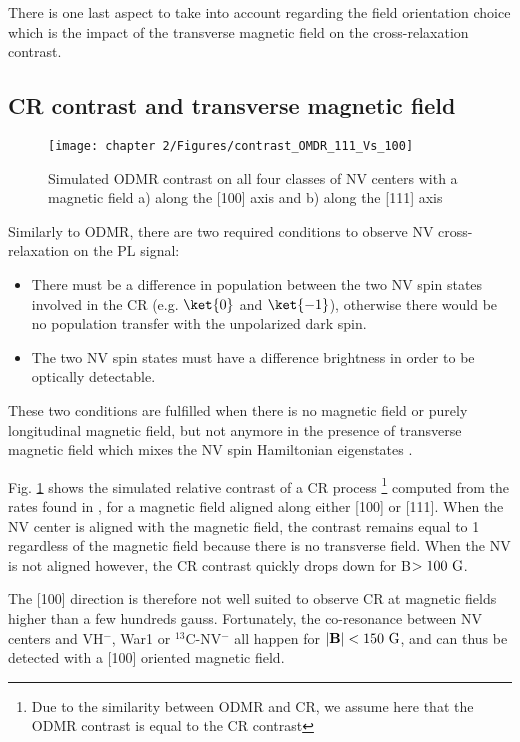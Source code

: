 \documentclass[a4paper, 11pt]{report}
\begin{document}
There is one last aspect to take into account regarding the field orientation choice which is the impact of the transverse magnetic field on the cross-relaxation contrast.

\subsection{CR contrast and transverse magnetic field}
\label{CR contrast}

\begin{figure}[h]
\centering
\texttt{[image: chapter 2/Figures/contrast\_OMDR\_111\_Vs\_100]}
\caption{Simulated ODMR contrast on all four classes of NV centers with a magnetic field a) along the [100] axis and b) along the [111] axis}
\label{121 vs 22 contrast}
\end{figure}

Similarly to ODMR, there are two required conditions to observe NV cross-relaxation on the PL signal: 
\begin{itemize}
\item There must be a difference in population between the two NV spin states involved in the CR (e.g. $\ket{0}$ and $\ket{-1}$), otherwise there would be no population transfer with the unpolarized dark spin.
\item The two NV spin states must have a difference brightness in order to be optically detectable.
\end{itemize}

These two conditions are fulfilled when there is no magnetic field or purely longitudinal magnetic field, but not anymore in the presence of transverse magnetic field which mixes the NV spin Hamiltonian eigenstates \citep{tetienne2012magnetic}.

Fig. \ref{121 vs 22 contrast} shows the simulated relative contrast of a CR process \footnote{Due to the similarity between ODMR and CR, we assume here that the ODMR contrast is equal to the CR contrast} computed from the rates found in \citep{tetienne2012magnetic}, for a magnetic field aligned along either [100] or [111]. When the NV center is aligned with the magnetic field, the contrast remains equal to 1 regardless of the magnetic field because there is no transverse field. When the NV is not aligned however, the CR contrast quickly drops down for B$>100\ \rm G$.

The [100] direction is therefore not well suited to observe CR at magnetic fields higher than a few hundreds gauss. Fortunately, the co-resonance between NV centers and VH$^-$, War1 or $^{13}$C-NV$^-$ all happen for $|\mathbf{B}| < 150 \ \rm G$, and can thus be detected with a [100] oriented magnetic field. 
\end{document}
